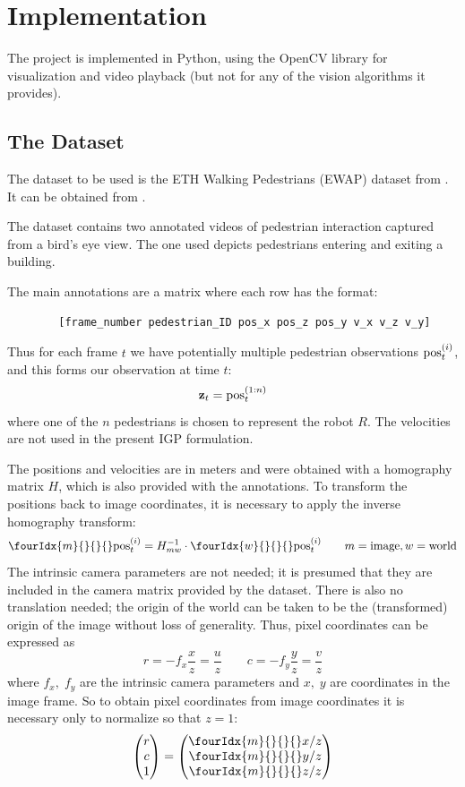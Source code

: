 \documentclass[a4paper,11pt,headings=small]{article}
\begin{document}
\section*{Implementation}
\quad The project is implemented in Python, using the OpenCV library\cite{opencv} for visualization and video playback (but not for any of the vision algorithms it provides).

\subsection*{The Dataset}
\quad The dataset to be used is the ETH Walking Pedestrians (EWAP) dataset from \cite{Pellegrini2009}. It can be obtained from \cite{dataset}.

The dataset contains two annotated videos of pedestrian interaction captured from a bird's eye view. The one used depicts pedestrians entering and exiting a building.

The main annotations are a matrix where each row has the format:
\begin{verbatim}
        [frame_number pedestrian_ID pos_x pos_z pos_y v_x v_z v_y]
\end{verbatim}

Thus for each frame $t$ we have potentially multiple pedestrian observations $\mathrm{pos}^{(i)}_t$, and this forms our observation at time $t$:
$$ \mathbf{z}_t = \mathrm{pos}^{(1:n)}_t $$
where one of the $n$ pedestrians is chosen to represent the robot $R$. The velocities are not used in the present IGP formulation.

The positions and velocities are in meters and were obtained with a homography matrix $H$, which is also provided with the annotations. To transform the positions back to image coordinates, it is necessary to apply the inverse homography transform:
$$ \fourIdx{m}{}{}{}\post = H_{mw}^{-1} \cdot \fourIdx{w}{}{}{}\post \qquad m = \mathrm{image}, w = \mathrm{world} $$
The intrinsic camera parameters are not needed; it is presumed that they are included in the camera matrix provided by the dataset. There is also no translation needed; the origin of the world can be taken to be the (transformed) origin of the image without loss of generality. Thus, pixel coordinates can be expressed as
$$ r = -f_x \frac{x}{z} = \frac{u}{z} \qquad c = -f_y \frac{y}{z} = \frac{v}{z} $$
where $f_x,\;f_y$ are the intrinsic camera parameters and $x,\;y$ are coordinates in the image frame. So to obtain pixel coordinates from image coordinates it is necessary only to normalize so that $z=1$:
$$ \begin{pmatrix}r\\c\\1\end{pmatrix} = \begin{pmatrix}\fourIdx{m}{}{}{}x/z\\\fourIdx{m}{}{}{}y/z\\\fourIdx{m}{}{}{}z/z\end{pmatrix} $$
\end{document}
